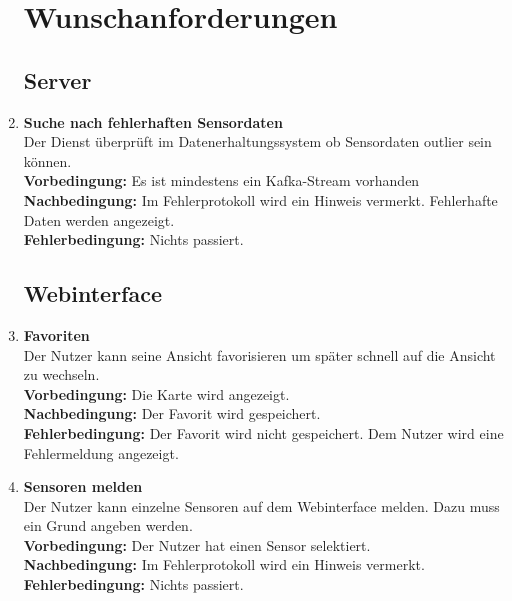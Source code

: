 \begin{enumerate}[label=\textbf{WF\arabic{enumi}0}]
	\setcounter{enumi}{99}
	\section{Wunschanforderungen}
	
	\subsection{Server}
	
	\item \textbf{Suche nach fehlerhaften Sensordaten}\\
	Der Dienst überprüft im Datenerhaltungssystem ob Sensordaten \gls{outlier} sein können.\\
	\textbf{Vorbedingung:} Es ist mindestens ein Kafka-Stream vorhanden\\
	\textbf{Nachbedingung:} Im Fehlerprotokoll wird ein Hinweis vermerkt. Fehlerhafte Daten werden angezeigt.\\
	\textbf{Fehlerbedingung:} Nichts passiert.
		
	\subsection{Webinterface}
	\setcounter{enumi}{199}
	
	\item \textbf{Favoriten}\\
		Der Nutzer kann seine Ansicht favorisieren um später schnell auf die Ansicht zu wechseln.\\
		\textbf{Vorbedingung:} Die Karte wird angezeigt.\\
		\textbf{Nachbedingung:} Der Favorit wird gespeichert.\\
		\textbf{Fehlerbedingung:} Der Favorit wird nicht gespeichert. Dem Nutzer wird eine Fehlermeldung angezeigt.
	
	\item \textbf{Sensoren melden}\\
		Der Nutzer kann einzelne Sensoren auf dem Webinterface melden. Dazu muss ein Grund angeben werden.\\
		\textbf{Vorbedingung:} Der Nutzer hat einen Sensor selektiert.\\
		\textbf{Nachbedingung:} Im Fehlerprotokoll wird ein Hinweis vermerkt.\\
		\textbf{Fehlerbedingung:} Nichts passiert.
		

\end{enumerate}
